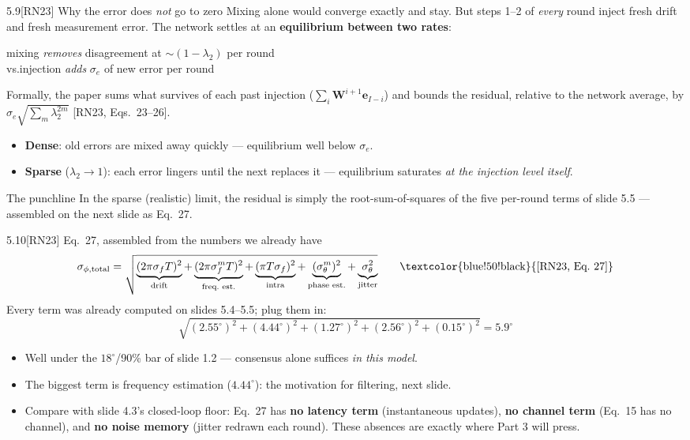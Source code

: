 \documentclass[10pt]{beamer}
\newcommand{\RN}[1]{\textcolor{blue!50!black}{[RN23#1]}}
\newcommand{\srcline}[1]{\par\vfill\noindent{\tiny\textcolor{gray}{Source: #1}}}
\begin{document}
\begin{frame}{5.9\quad \RN{} Why the error does \emph{not} go to zero}
Mixing alone would converge exactly and stay. But steps 1--2 of
\emph{every} round inject fresh drift and fresh measurement error. The
network settles at an \textbf{equilibrium between two rates}:
\begin{center}
mixing \emph{removes} disagreement at $\sim(1-\lambda_2)$ per round\\[2pt]
vs.\quad injection \emph{adds} $\sigma_e$ of new error per round
\end{center}
Formally, the paper sums what survives of each past injection
($\sum_i\mathbf W^{i+1}\mathbf e_{I-i}$) and bounds the residual,
relative to the network average, by
$\sigma_e\sqrt{\sum_m\lambda_2^{2m}}$ \RN{, Eqs.~23--26}.
\begin{itemize}
\item \textbf{Dense}: old errors are mixed away quickly ---
equilibrium well below $\sigma_e$.
\item \textbf{Sparse} ($\lambda_2\to1$): each error lingers until the
next replaces it --- equilibrium saturates \emph{at the injection
level itself}.
\end{itemize}
\begin{block}{The punchline}
In the sparse (realistic) limit, the residual is simply the
root-sum-of-squares of the five per-round terms of slide 5.5 ---
assembled on the next slide as Eq.~27.
\end{block}
\srcline{[RN23] \S III-A.}
\end{frame}

\begin{frame}{5.10\quad \RN{} Eq.~27, assembled from the numbers we already have}
\[
\sigma_{\phi,\mathrm{total}}
=\sqrt{\underbrace{(2\pi\sigma_fT)^2}_{\text{drift}}
+\underbrace{(2\pi\sigma^m_fT)^2}_{\text{freq.\ est.}}
+\underbrace{(\pi T\sigma_f)^2}_{\text{intra}}
+\underbrace{(\sigma^m_\theta)^2}_{\text{phase est.}}
+\underbrace{\sigma_\theta^2}_{\text{jitter}}}
\qquad\text{\RN{, Eq.~27}}
\]
Every term was already computed on slides 5.4--5.5; plug them in:
\[
\sqrt{(2.55^\circ)^2+(4.44^\circ)^2+(1.27^\circ)^2+(2.56^\circ)^2+(0.15^\circ)^2}
=5.9^\circ
\]
\begin{itemize}
\item Well under the $18^\circ$/90\% bar of slide 1.2 --- consensus
alone suffices \emph{in this model}.
\item The biggest term is frequency estimation ($4.44^\circ$): the
motivation for filtering, next slide.
\item Compare with slide 4.3's closed-loop floor: Eq.~27 has \textbf{no
latency term} (instantaneous updates), \textbf{no channel term} (Eq.~15
has no channel), and \textbf{no noise memory} (jitter redrawn each
round). These absences are exactly where Part 3 will press.
\end{itemize}
\srcline{[RN23] Eq.~27; term-by-term evaluation: this deck (matches the $5.9^\circ$ used in Part 3's validation).}
\end{frame}
\end{document}
